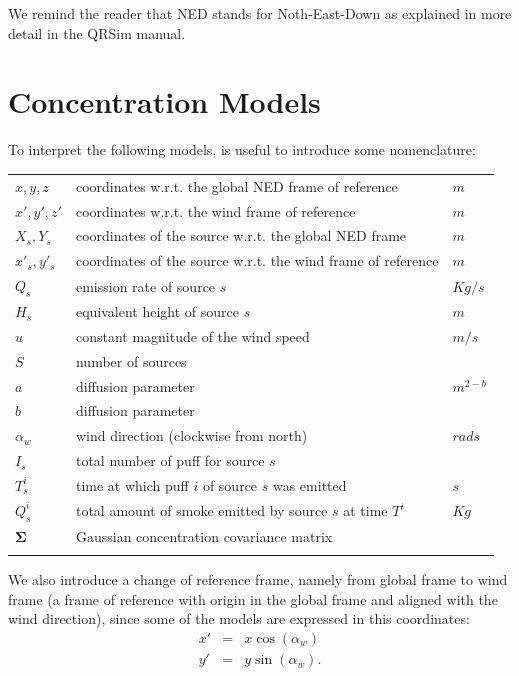\documentclass[a4paper,11pt]{report}
\newcommand{\sname}{QRSim\xspace}
\begin{document}
We remind the reader that NED stands for Noth-East-Down as explained in more detail in the \sname manual.

\chapter{Concentration Models}

To interpret the following models, is useful to introduce some nomenclature:
\begin{longtable}{l l l}
$x,y,z$ & coordinates w.r.t. the global NED frame of reference & $m$\\
$x',y',z'$ & coordinates w.r.t. the wind frame of reference & $m$\\
$X_s,Y_s$ & coordinates of the source w.r.t. the global NED frame  & $m$\\
$x\prime_s,y'_s$ & coordinates of the source w.r.t. the wind frame of reference  & $m$\\
$Q_s$ & emission rate of source $s$ & $Kg/s$\\
$H_s$ & equivalent height of source $s$ & $m$\\
$u$ & constant magnitude of the wind speed & $m/s$\\
$S$ & number of sources & \\
$a$ & diffusion parameter & $m^{2-b}$\\
$b$ & diffusion parameter & \\
$\alpha_w$ & wind direction (clockwise from north) & $rads$\\
$I_s$ & total number of puff for source $s$ & \\
$T^i_s$ & time at which puff $i$ of source $s$ was emitted & $s$\\
$Q^i_s$ & total amount of smoke emitted by source $s$ at time $T^i$ & $Kg$\\
$\boldsymbol\Sigma$ & Gaussian concentration covariance matrix \\
\label{tab:naming2}
\end{longtable}

We also introduce a change of reference frame, namely from global frame to wind frame (a frame of reference with origin in the global frame and aligned with the wind direction), since some of the models are expressed in this coordinates:
\begin{eqnarray}
x' &=& x \cos(\alpha_w) \\
y' &=& y \sin(\alpha_w).
\end{eqnarray}
\end{document}
